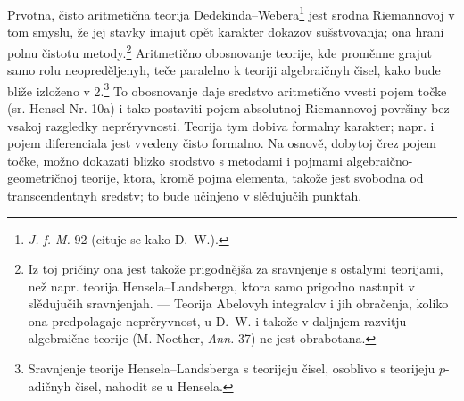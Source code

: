 \documentclass[11pt]{article}
\begin{document}
Prvotna, čisto aritmetična teorija Dedekinda--Webera\footnote{\emph{J. f. M.} 92 (cituje se kako D.--W.).} jest srodna Riemannovoj v tom smyslu, že jej stavky imajut opět karakter dokazov sušstvovanja; ona hrani polnu čistotu metody.\footnote{Iz toj pričiny ona jest takože prigodnějša za sravnjenje s ostalymi teorijami, než napr. teorija Hensela--Landsberga, ktora samo prigodno nastupit v slědujučih sravnjenjah. --- Teorija Abelovyh integralov i jih obračenja, koliko ona predpolagaje neprěryvnost, u D.--W. i takože v daljnjem razvitju algebraične teorije (M. Noether, \emph{Ann.} 37) ne jest obrabotana.} Aritmetično obosnovanje teorije, kde proměnne grajut samo rolu neopreděljenyh, teče paralelno k teoriji algebraičnyh čisel, kako bude bliže izloženo v 2.\footnote{Sravnjenje teorije Hensela--Landsberga s teorijeju čisel, osoblivo s teorijeju \(p\)-adičnyh čisel, nahodit se u Hensela.} To obosnovanje daje sredstvo aritmetično vvesti pojem točke (sr. Hensel Nr. 10a) i tako postaviti pojem absolutnoj Riemannovoj površiny bez vsakoj razgledky neprěryvnosti. Teorija tym dobiva formalny karakter; napr. i pojem diferenciala jest vvedeny čisto formalno. Na osnově, dobytoj črez pojem točke, možno dokazati blizko srodstvo s metodami i pojmami algebraično-geometričnoj teorije, ktora, kromě pojma elementa, takože jest svobodna od transcendentnyh sredstv; to bude učinjeno v slědujučih punktah.
\end{document}
